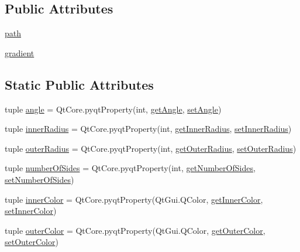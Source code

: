 \subsection*{Public Attributes}
\begin{DoxyCompactItemize}
\item 
\hyperlink{classpolygonwidget_1_1PolygonWidget_a471baa3a28f133005bf9a00c22cbaa4d}{path}
\item 
\hyperlink{classpolygonwidget_1_1PolygonWidget_a220ff294c9b4e82057894e6351a20bbf}{gradient}
\end{DoxyCompactItemize}
\subsection*{Static Public Attributes}
\begin{DoxyCompactItemize}
\item 
tuple \hyperlink{classpolygonwidget_1_1PolygonWidget_a206923722d26f72966534621bd580588}{angle} = Qt\+Core.\+pyqt\+Property(int, \hyperlink{classpolygonwidget_1_1PolygonWidget_a892b2fd36feedbbc415d7d1b925e2ca9}{get\+Angle}, \hyperlink{classpolygonwidget_1_1PolygonWidget_a187af97917838ba0d27688a94305380e}{set\+Angle})
\item 
tuple \hyperlink{classpolygonwidget_1_1PolygonWidget_a2ac6b478484e96f7afbb816c733bfd60}{inner\+Radius} = Qt\+Core.\+pyqt\+Property(int, \hyperlink{classpolygonwidget_1_1PolygonWidget_ace5b874afe41ef104f3bb5dfa74bbef6}{get\+Inner\+Radius}, \hyperlink{classpolygonwidget_1_1PolygonWidget_acacc82f9ad7204cbf5d356f9f8b9b232}{set\+Inner\+Radius})
\item 
tuple \hyperlink{classpolygonwidget_1_1PolygonWidget_a3c2be1c2b210680692414e9043803d29}{outer\+Radius} = Qt\+Core.\+pyqt\+Property(int, \hyperlink{classpolygonwidget_1_1PolygonWidget_a7220c22bfef31eca796fe9677bc97fc1}{get\+Outer\+Radius}, \hyperlink{classpolygonwidget_1_1PolygonWidget_a4afcd209d70db5165df3b2d2aa319a14}{set\+Outer\+Radius})
\item 
tuple \hyperlink{classpolygonwidget_1_1PolygonWidget_ace03a3ab04a542407e305e669ac04bc0}{number\+Of\+Sides} = Qt\+Core.\+pyqt\+Property(int, \hyperlink{classpolygonwidget_1_1PolygonWidget_ac6fb002a2ec8d53197ed8c9faa0759d7}{get\+Number\+Of\+Sides}, \hyperlink{classpolygonwidget_1_1PolygonWidget_a82f59e262d0ad45f4570c5febf922a97}{set\+Number\+Of\+Sides})
\item 
tuple \hyperlink{classpolygonwidget_1_1PolygonWidget_ad318837da432d0f8688d788260f96dcf}{inner\+Color} = Qt\+Core.\+pyqt\+Property(Qt\+Gui.\+Q\+Color, \hyperlink{classpolygonwidget_1_1PolygonWidget_a3fe29a6cbf3ec8c244be4ef87d4b9729}{get\+Inner\+Color}, \hyperlink{classpolygonwidget_1_1PolygonWidget_a969cc7cf0c212bf6c450dce615471830}{set\+Inner\+Color})
\item 
tuple \hyperlink{classpolygonwidget_1_1PolygonWidget_af7fc9239d0100c6817e44ae27d6f5235}{outer\+Color} = Qt\+Core.\+pyqt\+Property(Qt\+Gui.\+Q\+Color, \hyperlink{classpolygonwidget_1_1PolygonWidget_a0169838801299ad357aaef64a473c09a}{get\+Outer\+Color}, \hyperlink{classpolygonwidget_1_1PolygonWidget_a48e99f13441357fec54a0df8a5d2a381}{set\+Outer\+Color})
\end{DoxyCompactItemize}



